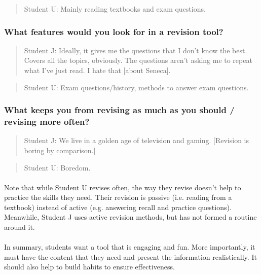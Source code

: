 \documentclass{report}
\begin{document}
\begin{quote}{Student U:}
  Mainly reading textbooks and exam questions.
\end{quote}
\subsubsection{What features would you look for in a revision tool?}
\begin{quote}{Student J:}
  Ideally, it gives me the questions that I don't know the best. Covers all the topics, obviously. The questions aren't asking me to repeat what I've just read. I hate that [about Seneca].
\end{quote}

\begin{quote}{Student U:}
  Exam questions/history, methods to answer exam questions.
\end{quote}
\subsubsection{What keeps you from revising as much as you should / revising more often?}
\begin{quote}{Student J:}
  We live in a golden age of television and gaming. [Revision is boring by comparison.]
\end{quote}

\begin{quote}{Student U:}
  Boredom.
\end{quote}
\hrulefill

\paragraph{}
Note that while Student U revises often, the way they revise doesn't help to practice the skills they need. Their revision is passive (i.e. reading from a textbook) instead of active (e.g. answering recall and practice questions). Meanwhile, Student J uses active revision methods, but has not formed a routine around it.

\paragraph{}
In summary, students want a tool that is engaging and fun. More importantly, it must have the content that they need and present the information realistically. It should also help to build habits to ensure effectiveness.
\end{document}
